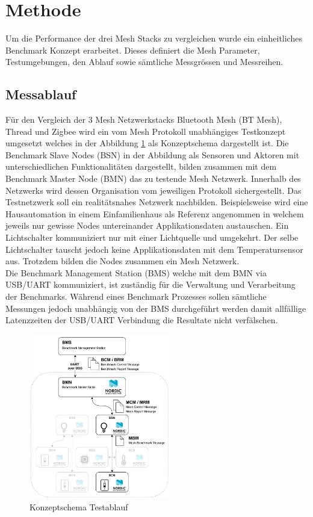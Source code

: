 \clearpage
\section{Methode}\label{sec:Methode}
Um die Performance der drei Mesh Stacks zu vergleichen wurde ein einheitliches Benchmark Konzept erarbeitet. Dieses definiert die Mesh Parameter, Testumgebungen, den Ablauf sowie sämtliche Messgrössen und Messreihen.

\subsection{Messablauf}
Für den Vergleich der 3 Mesh Netzwerkstacks Bluetooth Mesh (BT Mesh), Thread und Zigbee wird ein vom Mesh Protokoll unabhängiges Testkonzept umgesetzt welches in der Abbildung \ref{fig:KonzeptschemaTestablauf} als Konzeptschema dargestellt ist. Die Benchmark Slave Nodes (BSN) in der Abbildung als Sensoren und Aktoren mit unterschiedlichen Funktionalitäten dargestellt, bilden zusammen mit dem Benchmark Master Node (BMN) das zu testende Mesh Netzwerk. Innerhalb des Netzwerks wird dessen Organisation vom jeweiligen Protokoll sichergestellt. Das Testnetzwerk soll ein realitätsnahes Netzwerk nachbilden. Beispielsweise wird eine Hausautomation in einem Einfamilienhaus als Referenz angenommen in welchem jeweils nur gewisse Nodes untereinander Applikationsdaten austauschen. Ein Lichtschalter kommuniziert nur mit einer Lichtquelle und umgekehrt. Der selbe Lichtschalter tauscht jedoch keine Applikationsdaten mit dem Temperatursensor aus. Trotzdem bilden die Nodes zusammen ein Mesh Netzwerk.\\

Die Benchmark Management Station (BMS) welche mit dem BMN via USB/UART kommuniziert, ist zuständig für die Verwaltung und Verarbeitung der Benchmarks. Während eines Benchmark Prozesses sollen sämtliche Messungen jedoch unabhängig von der BMS durchgeführt werden damit allfällige Latenzzeiten der USB/UART Verbindung die Resultate nicht verfälschen.

\begin{figure}[h]
	\centering
	\includegraphics[width=0.55\textwidth]{graphics/Mesh_Testkonzeptschema.png}
	\caption{Konzeptschema Testablauf}
	\label{fig:KonzeptschemaTestablauf}
\end{figure}

